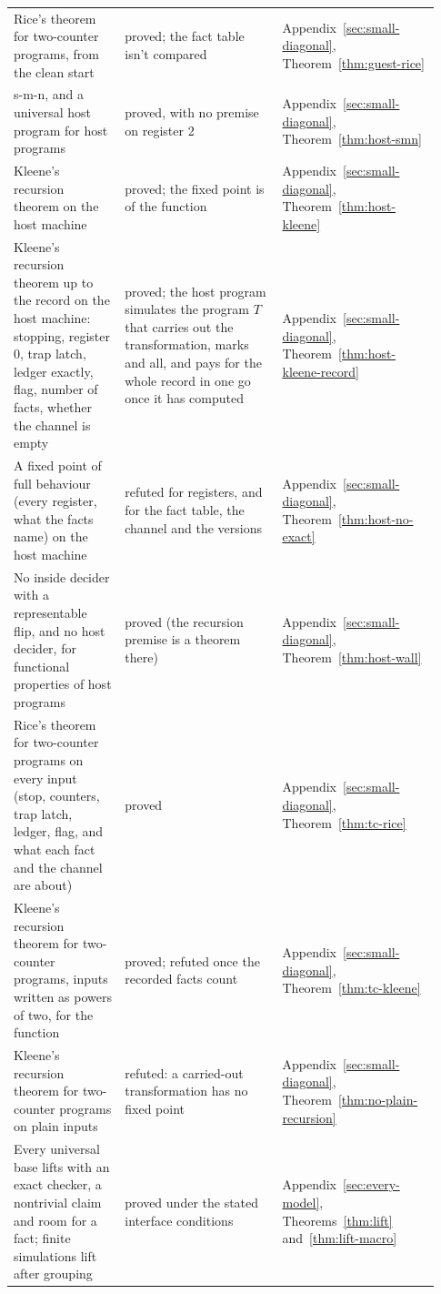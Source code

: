 \documentclass[11pt,twoside]{article}
\theoremstyle{thielethm}
\theoremstyle{thieledef}
\theoremstyle{thieledef}
\theoremstyle{thieledef}
\theoremstyle{thielethm}
\theoremstyle{thieleobs}
\theoremstyle{thielethm}
\begin{document}
\begin{longtable}{@{}>{\raggedright\arraybackslash}p{0.242\linewidth}>{\raggedright\arraybackslash}p{0.344\linewidth}>{\raggedright\arraybackslash}p{0.344\linewidth}@{}}
Rice's theorem for two-counter programs, from the clean start & proved; the fact table isn't compared & Appendix~\ref{sec:small-diagonal}, Theorem~\ref{thm:guest-rice} \\
s-m-n, and a universal host program for host programs & proved, with no premise on register 2 & Appendix~\ref{sec:small-diagonal}, Theorem~\ref{thm:host-smn} \\
Kleene's recursion theorem on the host machine & proved; the fixed point is of the function & Appendix~\ref{sec:small-diagonal}, Theorem~\ref{thm:host-kleene} \\
Kleene's recursion theorem up to the record on the host machine: stopping, register 0, trap latch, ledger exactly, flag, number of facts, whether the channel is empty & proved; the host program simulates the program $T$ that carries out the transformation, marks and all, and pays for the whole record in one go once it has computed & Appendix~\ref{sec:small-diagonal}, Theorem~\ref{thm:host-kleene-record} \\
A fixed point of full behaviour (every register, what the facts name) on the host machine & refuted for registers, and for the fact table, the channel and the versions  & Appendix~\ref{sec:small-diagonal}, Theorem~\ref{thm:host-no-exact} \\
No inside decider with a representable flip, and no host decider, for functional properties of host programs & proved (the recursion premise is a theorem there) & Appendix~\ref{sec:small-diagonal}, Theorem~\ref{thm:host-wall} \\
Rice's theorem for two-counter programs on every input (stop, counters, trap latch, ledger, flag, and what each fact and the channel are about) & proved & Appendix~\ref{sec:small-diagonal}, Theorem~\ref{thm:tc-rice} \\
Kleene's recursion theorem for two-counter programs, inputs written as powers of two, for the function & proved; refuted once the recorded facts count & Appendix~\ref{sec:small-diagonal}, Theorem~\ref{thm:tc-kleene} \\
Kleene's recursion theorem for two-counter programs on plain inputs & refuted: a carried-out transformation has no fixed point & Appendix~\ref{sec:small-diagonal}, Theorem~\ref{thm:no-plain-recursion} \\
Every universal base lifts with an exact checker, a nontrivial claim and room for a fact; finite simulations lift after grouping & proved under the stated interface conditions & Appendix~\ref{sec:every-model}, Theorems~\ref{thm:lift} and~\ref{thm:lift-macro} \\

\end{longtable}
\end{document}
